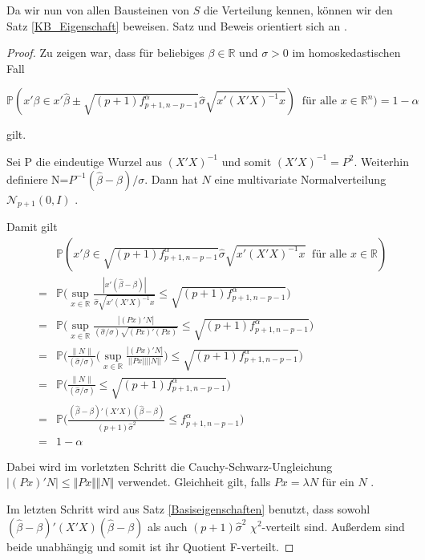 \documentclass[12pt,a4paper]{article}
\theoremstyle{definition}
\theoremstyle{definition}
\theoremstyle{definition}
\begin{document}
Da wir nun von allen Bausteinen von $S$ die Verteilung kennen, können wir den Satz \ref{KB_Eigenschaft} beweisen. Satz und Beweis orientiert sich an \cite[66]{Liu64}.

\begin{proof}
Zu zeigen war, dass für beliebiges $\beta \in \mathbb{R}$ und $\sigma > 0$  im homoskedastischen Fall

\begin{equation*}
\mathbb{P}( x'\beta \in x' \hat{\beta} \pm \sqrt{(p+1) f^{\alpha}_{p+1,n-p-1}} \hat{\sigma} \sqrt{x' (X'X)^{-1}x}) ~ \text{ für alle } x \in \mathbb{R}^{n}) = 1 - \alpha
\end{equation*}

gilt. 

Sei \gls{P} die eindeutige Wurzel aus $(X'X)^{-1}$ und somit $(X'X)^{-1} = P^2$. Weiterhin definiere \gls{N}=$P^{-1}(\hat{\beta}-\beta)/\sigma$. Dann hat $N$ eine multivariate Normalverteilung $\mathscr{N}_{p+1}(0,I)$ . 

Damit gilt
\begin{eqnarray*}
&&\mathbb{P}(x'\beta \in \sqrt{(p+1) f^{\alpha}_{p+1,n-p-1}} \hat{\sigma} \sqrt{x'(X'X)^{-1}x} ~ \text{ für alle } x \in \mathbb{R}) \\ 
&=& \mathbb{P} \big ( \sup_{x \in \mathbb{R}} \frac{|x'(\hat{\beta}-\beta)|}{\hat{\sigma} \sqrt{x'(X'X)^{-1}x}} \leq \sqrt{(p+1) f^{\alpha}_{p+1,n-p-1}} \big ) \\
&=& \mathbb{P} \big ( \sup_{x \in \mathbb{R}} \frac{|(Px)'N|}{(\hat{\sigma}/\sigma)\sqrt{(Px)'(Px)}} \leq \sqrt{(p+1) f^{\alpha}_{p+1,n-p-1}} \big ) \\
&=& \mathbb{P} \big ( \frac{\parallel N \parallel}{(\hat{\sigma}/\sigma)} \bigg ( \sup_{x \in \mathbb{R}} \frac{|(Px)'N|}{||Px|| ||N||} \bigg ) \leq \sqrt{(p+1) f^{\alpha}_{p+1,n-p-1}} \big ) \\
&=& \mathbb{P} \big (\frac{\parallel N \parallel}{(\hat{\sigma}/\sigma)} \leq \sqrt{(p+1) f^{\alpha}_{p+1,n-p-1}} \big ) \\
&=& \mathbb{P} \big (\frac{(\hat{\beta}-\beta)'(X'X)(\hat{\beta}-\beta)}{(p+1)\hat{\sigma}^2} \leq f^{\alpha}_{p+1,n-p-1} \big ) \\
&=& 1 - \alpha
\end{eqnarray*}

Dabei wird im vorletzten Schritt  die Cauchy-Schwarz-Ungleichung $ \vert (Px)'N \vert \leq \Vert Px \Vert \Vert N \Vert $ verwendet. Gleichheit gilt, falls $P x = \lambda N$ für ein $N$ . 

Im letzten Schritt wird aus Satz \ref{Basiseigenschaften} benutzt, dass sowohl $(\hat{\beta}-\beta)'(X'X)(\hat{\beta}-\beta)$ als auch $(p+1)\hat{\sigma}^2$ $\chi^2$-verteilt sind. Außerdem sind beide unabhängig und somit ist ihr Quotient F-verteilt.

\end{proof}
\end{document}
